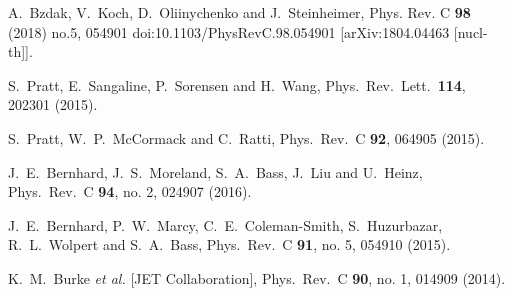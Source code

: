 \documentclass[aps,prc,nofootinbib,showpacs,superscriptaddress,groupedaddress]{revtex4-1}
\begin{document}
\begin{thebibliography}{99}
A.~Bzdak, V.~Koch, D.~Oliinychenko and J.~Steinheimer,
Phys. Rev. C \textbf{98} (2018) no.5, 054901
doi:10.1103/PhysRevC.98.054901
[arXiv:1804.04463 [nucl-th]].














  S.~Pratt, E.~Sangaline, P.~Sorensen and H.~Wang,
  Phys.\ Rev.\ Lett.\  {\bf 114}, 202301 (2015).
  
	
  S.~Pratt, W.~P.~McCormack and C.~Ratti,
  Phys.\ Rev.\ C {\bf 92}, 064905 (2015).
  
  J.~E.~Bernhard, J.~S.~Moreland, S.~A.~Bass, J.~Liu and U.~Heinz,
  Phys.\ Rev.\ C {\bf 94}, no. 2, 024907 (2016).
  
  J.~E.~Bernhard, P.~W.~Marcy, C.~E.~Coleman-Smith, S.~Huzurbazar, R.~L.~Wolpert and S.~A.~Bass,
  Phys.\ Rev.\ C {\bf 91}, no. 5, 054910 (2015).

  K.~M.~Burke {\it et al.} [JET Collaboration],
  Phys.\ Rev.\ C {\bf 90}, no. 1, 014909 (2014).


\end{thebibliography}
\end{document}

